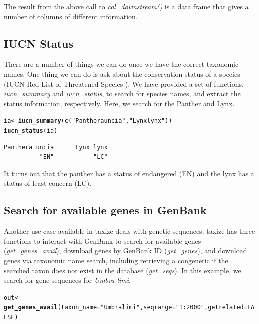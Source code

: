 \documentclass[10pt]{article}\usepackage[]{graphicx}\usepackage[]{color}
\makeatletter
\newcommand{\hlfunctioncall}[1]{\textcolor[rgb]{0.501960784313725,0,0.329411764705882}{\textbf{#1}}}%
\newcommand{\hlstring}[1]{\textcolor[rgb]{0.6,0.6,1}{#1}}%
\newenvironment{kframe}{%
 \def\at@end@of@kframe{}%
 \ifinner\ifhmode%
  \def\at@end@of@kframe{\end{minipage}}%
  \begin{minipage}{\columnwidth}%
 \fi\fi%
 \def\FrameCommand##1{\hskip\@totalleftmargin \hskip-\fboxsep
 \colorbox{shadecolor}{##1}\hskip-\fboxsep
     \hskip-\linewidth \hskip-\@totalleftmargin \hskip\columnwidth}%
 \MakeFramed {\advance\hsize-\width
   \@totalleftmargin\z@ \linewidth\hsize
   \@setminipage}}%
 {\par\unskip\endMakeFramed%
 \at@end@of@kframe}
\newenvironment{knitrout}{}{} %
\makeatother
\begin{document}
The result from the above call to \emph{col\_downstream()} is a data.frame that gives a number of columns of different information. 

\subsection*{IUCN Status}
There are a number of things we can do once we have the correct taxonomic names. One thing we can do is ask about the conservation status of a species (IUCN Red List of Threatened Species \cite{iucn}). We have provided a set of functions, \emph{iucn\_summary} and \emph{iucn\_status}, to search for species names, and extract the status information, respectively. Here, we search for the Panther and Lynx.  

\begin{knitrout}
\color{fgcolor}\begin{kframe}
\begin{alltt}
ia <- \hlfunctioncall{iucn_summary}(\hlfunctioncall{c}(\hlstring{"Panthera uncia"}, \hlstring{"Lynx lynx"}))
\hlfunctioncall{iucn_status}(ia)
\end{alltt}
\begin{verbatim}
Panthera uncia      Lynx lynx 
          "EN"           "LC" 
\end{verbatim}
\end{kframe}
\end{knitrout}


It turns out that the panther has a status of endangered (EN) and the lynx has a status of least concern (LC).

\subsection*{Search for available genes in GenBank}
Another use case available in taxize deals with genetic sequences. taxize has three functions to interact with GenBank to search for available genes (\emph{get\_genes\_avail}), download genes by GenBank ID (\emph{get\_genes}), and download genes via taxonomic name search, including retrieving a congeneric if the searched taxon does not exist in the database (\emph{get\_seqs}). In this example, we search for gene sequences for \emph{Umbra limi}.

\begin{knitrout}
\color{fgcolor}\begin{kframe}
\begin{alltt}
out <- \hlfunctioncall{get_genes_avail}(taxon_name = \hlstring{"Umbra limi"}, seqrange = \hlstring{"1:2000"}, getrelated = FALSE)
\end{alltt}
\end{kframe}
\end{knitrout}
\end{document}
